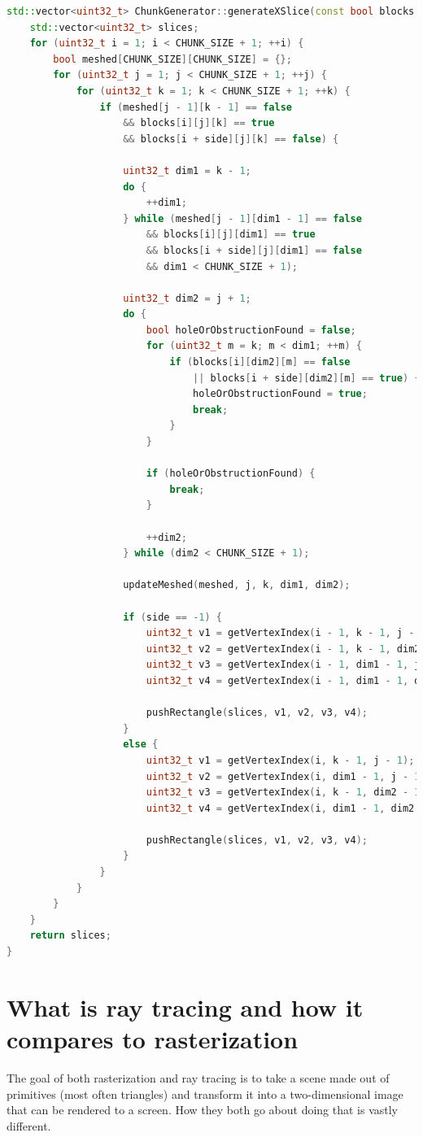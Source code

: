 \documentclass[times, utf8, zavrsni, numeric]{fer}
\begin{document}
\pagebreak

\begin{lstlisting}[language=c++, style=cppstyle, caption=Code for handling chunk slices parallel to the YZ plane, frame=single]
std::vector<uint32_t> ChunkGenerator::generateXSlice(const bool blocks[CHUNK_PADDED_SIZE][CHUNK_PADDED_SIZE][CHUNK_PADDED_SIZE], int32_t side) const {
	std::vector<uint32_t> slices;
	for (uint32_t i = 1; i < CHUNK_SIZE + 1; ++i) {
		bool meshed[CHUNK_SIZE][CHUNK_SIZE] = {};
		for (uint32_t j = 1; j < CHUNK_SIZE + 1; ++j) {
			for (uint32_t k = 1; k < CHUNK_SIZE + 1; ++k) {
				if (meshed[j - 1][k - 1] == false
					&& blocks[i][j][k] == true
					&& blocks[i + side][j][k] == false) {

					uint32_t dim1 = k - 1;
					do {
						++dim1;
					} while (meshed[j - 1][dim1 - 1] == false
						&& blocks[i][j][dim1] == true
						&& blocks[i + side][j][dim1] == false
						&& dim1 < CHUNK_SIZE + 1);

					uint32_t dim2 = j + 1;
					do {
						bool holeOrObstructionFound = false;
						for (uint32_t m = k; m < dim1; ++m) {
							if (blocks[i][dim2][m] == false
								|| blocks[i + side][dim2][m] == true) {
								holeOrObstructionFound = true;
								break;
							}
						}

						if (holeOrObstructionFound) {
							break;
						}

						++dim2;
					} while (dim2 < CHUNK_SIZE + 1);

					updateMeshed(meshed, j, k, dim1, dim2);

					if (side == -1) {
						uint32_t v1 = getVertexIndex(i - 1, k - 1, j - 1);
						uint32_t v2 = getVertexIndex(i - 1, k - 1, dim2 - 1);
						uint32_t v3 = getVertexIndex(i - 1, dim1 - 1, j - 1);
						uint32_t v4 = getVertexIndex(i - 1, dim1 - 1, dim2 - 1);

						pushRectangle(slices, v1, v2, v3, v4);
					}
					else {
						uint32_t v1 = getVertexIndex(i, k - 1, j - 1);
						uint32_t v2 = getVertexIndex(i, dim1 - 1, j - 1);
						uint32_t v3 = getVertexIndex(i, k - 1, dim2 - 1);
						uint32_t v4 = getVertexIndex(i, dim1 - 1, dim2 - 1);

						pushRectangle(slices, v1, v2, v3, v4);
					}
				}
			}
		}
	}
	return slices;
}
\end{lstlisting}

\chapter{What is ray tracing and how it compares to rasterization}
The goal of both rasterization and ray tracing is to take a scene made out of primitives (most often triangles) and transform it into a two-dimensional image that can be rendered to a screen. How they both go about doing that is vastly different.
\end{document}

